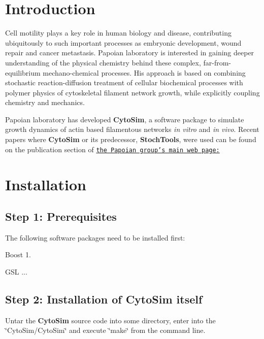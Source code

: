 \hypertarget{index_intro_sec}{}\section{Introduction}\label{index_intro_sec}
Cell motility plays a key role in human biology and disease, contributing ubiquitously to such important processes as embryonic development, wound repair and cancer metastasis. Papoian laboratory is interested in gaining deeper understanding of the physical chemistry behind these complex, far-\/from-\/equilibrium mechano-\/chemical processes. His approach is based on combining stochastic reaction-\/diffusion treatment of cellular biochemical processes with polymer physics of cytoskeletal filament network growth, while explicitly coupling chemistry and mechanics.

Papoian laboratory has developed {\bfseries Cyto\-Sim}, a software package to simulate growth dynamics of actin based filamentous networks {\itshape in vitro\/} and {\itshape in vivo\/}. Recent papers where {\bfseries Cyto\-Sim} or its predecessor, {\bfseries Stoch\-Tools}, were used can be found on the publication section of \href{http://papoian.chem.umd.edu/}{\tt the Papoian group's main web page\-:}\hypertarget{index_install_sec}{}\section{Installation}\label{index_install_sec}
\hypertarget{index_step1}{}\subsection{Step 1\-: Prerequisites}\label{index_step1}
The following software packages need to be installed first\-:


\begin{DoxyItemize}
\item Boost 1.
\begin{DoxyItemize}
\item G\-S\-L ...
\end{DoxyItemize}
\end{DoxyItemize}\hypertarget{index_step2}{}\subsection{Step 2\-: Installation of Cyto\-Sim itself}\label{index_step2}
Untar the {\bfseries Cyto\-Sim} source code into some directory, enter into the \char`\"{}\-Cyto\-Sim/\-Cyto\-Sim\char`\"{} and execute \char`\"{}make\char`\"{} from the command line. 